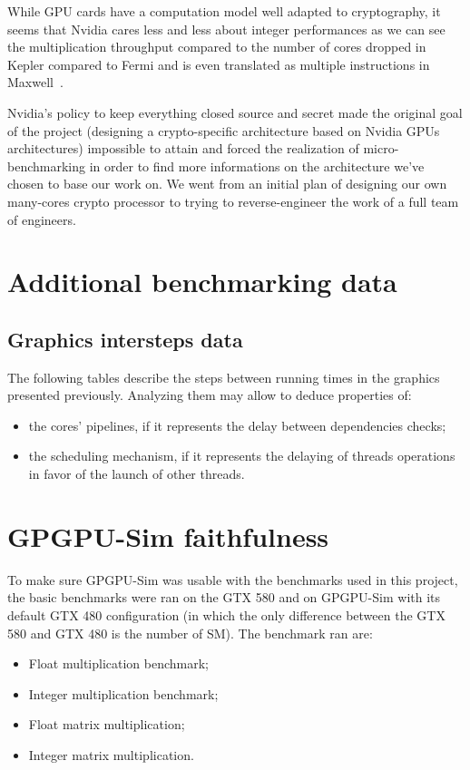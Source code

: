 \documentclass{report}
\begin{document}
    While GPU cards have a computation model well adapted to cryptography, it seems that Nvidia
    cares less and less about integer performances as we can see the multiplication throughput
    compared to the number of cores dropped in Kepler compared to Fermi and is even translated as
    multiple instructions in Maxwell~\cite{cudaprog}.
   
    Nvidia's policy to keep everything closed source and secret made the original 
    goal of the project (designing a crypto-specific architecture based on Nvidia GPUs architectures)
    impossible to attain and forced the realization of micro-benchmarking 
    in order to find more informations on the architecture we've chosen to base our work on. We went 
    from an initial plan of designing our own many-cores crypto processor to trying to 
    reverse-engineer the work of a full team of engineers.

  \appendix 
   
\chapter{Additional benchmarking data}
    \section{Graphics intersteps data}
    The following tables describe the steps between running times in the graphics presented previously. Analyzing them may allow to deduce properties of: 
    \begin{itemize} 
        \item the cores' pipelines, if it represents the delay between dependencies checks;
        \item the scheduling mechanism, if it represents the delaying of threads operations in favor of the launch of other threads.
    \end{itemize}
    
    \centering
    
    
    \pagebreak
    

\chapter{GPGPU-Sim faithfulness}
    To make sure GPGPU-Sim was usable with the benchmarks used in this project, the basic benchmarks were
    ran on the GTX 580 and on GPGPU-Sim with its default GTX 480 configuration (in which the only difference
    between the GTX 580 and GTX 480 is the number of SM). The benchmark ran are:
    \begin{itemize}
        \item Float multiplication benchmark;
        \item Integer multiplication benchmark;
        \item Float matrix multiplication; 
        \item Integer matrix multiplication.
    \end{itemize}
\end{document}
